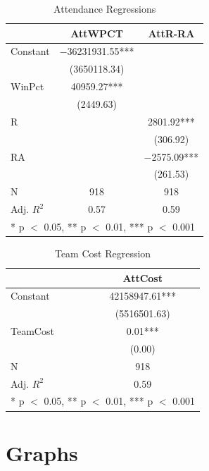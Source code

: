 \documentclass[
  12pt,
  letterpaper,
  DIV=11,
  numbers=noendperiod]{scrartcl}
\begin{document}
\hypertarget{tbl-AttSum}{}
\begin{table}
\caption{\label{tbl-AttSum}Attendance Regressions }\tabularnewline

\centering
\begin{tabular}[t]{lcc}
\toprule
  & AttWPCT & AttR-RA\\
\midrule
Constant & \num{-36231931.55}*** & \\
 & (\num{3650118.34}) & \\
WinPct & \num{40959.27}*** & \\
 & (\num{2449.63}) & \\
R &  & \num{2801.92}***\\
 &  & (\num{306.92})\\
RA &  & \num{-2575.09}***\\
 &  & (\num{261.53})\\
\midrule
N & \num{918} & \num{918}\\
Adj. $R^2$ & \num{0.57} & \num{0.59}\\
\bottomrule
\multicolumn{3}{l}{\rule{0pt}{1em}* p $<$ 0.05, ** p $<$ 0.01, *** p $<$ 0.001}\\
\end{tabular}
\end{table}

\hypertarget{tbl-OtherSum}{}
\begin{table}
\caption{\label{tbl-OtherSum}Team Cost Regression }\tabularnewline

\centering
\begin{tabular}[t]{lc}
\toprule
  & AttCost\\
\midrule
Constant & \num{42158947.61}***\\
 & (\num{5516501.63})\\
TeamCost & \num{0.01}***\\
 & (\num{0.00})\\
\midrule
N & \num{918}\\
Adj. $R^2$ & \num{0.59}\\
\bottomrule
\multicolumn{2}{l}{\rule{0pt}{1em}* p $<$ 0.05, ** p $<$ 0.01, *** p $<$ 0.001}\\
\end{tabular}
\end{table}

\newpage

\hypertarget{graphs}{%
\section{Graphs}\label{graphs}}
\end{document}
